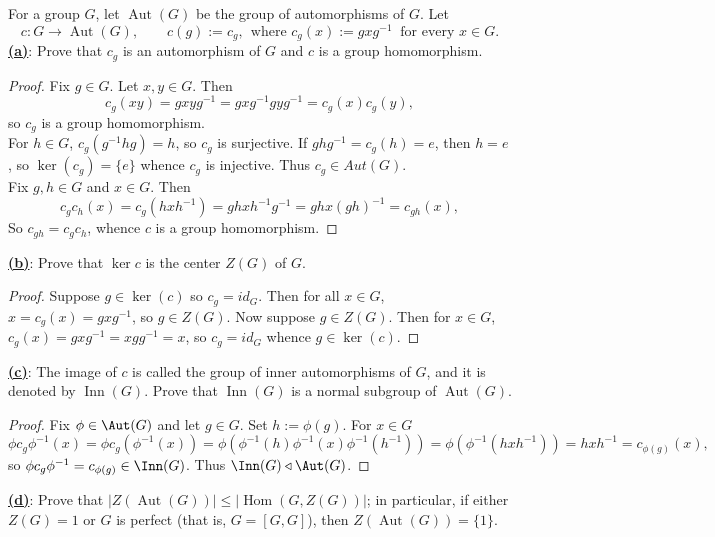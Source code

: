 \documentclass[12pt]{article}
\begin{document}
\begin{homeworkProblem}
 For a group $G$, let $\operatorname{Aut}(G)$ be the group of automorphisms of $G$. Let
\[
  c : G \to \operatorname{Aut}(G),\qquad c(g) := c_g,\ \ \text{where } c_g(x) := gxg^{-1}\ \text{ for every } x \in G.
\]
\underline{\textbf{(a)}}: Prove that $c_g$ is an automorphism of $G$ and $c$ is a group homomorphism.

\begin{proof}
  Fix $ g\in G $. Let $ x,y\in G $. Then $$ c_{g}(xy) = gxyg^{-1} = gxg^{-1}gyg^{-1} = c_{g}(x)c_{g}(y), $$ so $ c_{g} $ is a group homomorphism.\\

  For $ h\in G $, $ c_{g}(g^{-1}hg) = h $, so $ c_{g} $ is surjective. If $ ghg^{-1} = c_{g}(h) = e $, then $ h=e $, so $ \ker(c_{g}) = \{e\} $ whence $ c_{g} $ is injective. Thus $ c_{g}\in Aut(G) $.\\

  Fix $ g,h\in G $ and $ x\in G $. Then 
  \[
    c_{g}c_{h}(x) = c_{g}(hxh^{-1}) = ghxh^{-1}g^{-1} = ghx(gh)^{-1} = c_{gh}(x),
  \]
  So $ c_{gh}= c_{g}c_{h} $, whence $ c $ is a group homomorphism.
\end{proof}


\underline{\textbf{(b)}}: Prove that $\ker c$ is the center $Z(G)$ of $G$.

\begin{proof}
  Suppose $ g\in\ker(c) $ so $ c_{g} = id_{G} $. Then for all $ x\in G $, $ x = c_{g}(x) = gxg^{-1} $, so $ g\in Z(G) $. Now suppose $ g\in Z(G) $. Then for $ x\in G $, $ c_{g}(x) = gxg^{-1}=xgg^{-1} = x $, so $ c_{g}=id_{G} $ whence $ g\in \ker(c) $.
\end{proof}


\underline{\textbf{(c)}}: The image of $c$ is called the group of inner automorphisms of $G$, and it is denoted by $\operatorname{Inn}(G)$. Prove that $\operatorname{Inn}(G)$ is a normal subgroup of $\operatorname{Aut}(G)$.

\begin{proof}
 Fix $ \phi\in \Aut(G) $ and let $ g\in G $. Set $ h:=\phi(g) $. For $ x\in G $
 \[
   \phi c_{g} \phi^{-1}(x) = \phi c_{g}(\phi^{-1}(x)) = \phi(\phi^{-1}(h) \phi^{-1}(x) \phi^{-1}(h^{-1})) = \phi(\phi^{-1}(hxh^{-1})) = hxh^{-1} = c_{\phi(g)}(x),
 \]
 so $ \phi c_{g} \phi^{-1} = c_{\phi(g)} \in \Inn(G)$. Thus $ \Inn(G)\triangleleft \Aut(G) $.
\end{proof}



\underline{\textbf{(d)}}: Prove that $\lvert Z(\operatorname{Aut}(G))\rvert \le \lvert \operatorname{Hom}(G, Z(G))\rvert$; in particular, if either $Z(G)=1$ or $G$ is perfect (that is, $G=[G,G]$), then $Z(\operatorname{Aut}(G))=\{1\}$.


\end{homeworkProblem}
\end{document}
